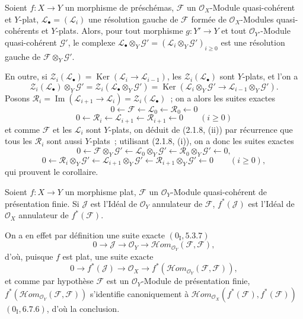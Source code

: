 \begin{corollary}[2.1.10]
\label{IV.2.1.10-fr}
Soient $f:X\to Y$ un morphisme de préschémas, $\mathscr F$ un
$\mathcal O_X$-Module quasi-cohérent et $Y$-plat,
$\mathscr L_\bullet=(\mathscr L_i)$ une résolution gauche de $\mathscr F$
formée de $\mathcal O_X$-Modules quasi-cohérents et $Y$-plats. Alors, pour
tout morphisme $g:Y'\to Y$ et tout $\mathcal O_{Y'}$-Module quasi-cohérent
$\mathscr G'$, le complexe
$\mathscr L_\bullet\otimes_Y\mathscr G'=
(\mathscr L_i\otimes_Y\mathscr G')_{i\geq0}$ est une résolution gauche de
$\mathscr F\otimes_Y\mathscr G'$.

En outre, si
$\mathscr Z_i(\mathscr L_\bullet)=\operatorname{Ker}
(\mathscr L_i\to\mathscr L_{i-1})$, les $\mathscr Z_i(\mathscr L_\bullet)$
sont $Y$-plats, et l'on a
\[
\mathscr Z_i(\mathscr L_\bullet)\otimes_Y\mathscr G'
=\mathscr Z_i(\mathscr L_\bullet\otimes_Y\mathscr G')
=\operatorname{Ker}(\mathscr L_i\otimes_Y\mathscr G'
\to\mathscr L_{i-1}\otimes_Y\mathscr G').
\]
Posons
$\mathscr R_i=\operatorname{Im}(\mathscr L_{i+1}\to\mathscr L_i)
=\mathscr Z_i(\mathscr L_\bullet)$~; on a alors les suites exactes
\[
0\leftarrow\mathscr F\leftarrow\mathscr L_0\leftarrow\mathscr R_0\leftarrow0
\]
\[
0\leftarrow\mathscr R_i\leftarrow\mathscr L_{i+1}
\leftarrow\mathscr R_{i+1}\leftarrow0\qquad(i\geq0)
\]
et comme $\mathscr F$ et les $\mathscr L_i$ sont $Y$-plats, on déduit de
(2.1.8, (ii)) par récurrence que tous les $\mathscr R_i$ sont aussi
$Y$-plats~; utilisant (2.1.8, (i)), on a donc les suites exactes
\[
0\leftarrow\mathscr F\otimes_Y\mathscr G'
\leftarrow\mathscr L_0\otimes_Y\mathscr G'
\leftarrow\mathscr R_0\otimes_Y\mathscr G'\leftarrow0,
\]
\[
0\leftarrow\mathscr R_i\otimes_Y\mathscr G'
\leftarrow\mathscr L_{i+1}\otimes_Y\mathscr G'
\leftarrow\mathscr R_{i+1}\otimes_Y\mathscr G'\leftarrow0
\qquad(i\geq0),
\]
qui prouvent le corollaire.
\end{corollary}

\begin{proposition}[2.1.11]
\label{IV.2.1.11-fr}
Soient $f:X\to Y$ un morphisme plat, $\mathscr F$ un $\mathcal O_Y$-Module
quasi-cohérent de présentation finie. Si $\mathscr J$ est l'Idéal de
$\mathcal O_Y$ annulateur de $\mathscr F$, $f^*(\mathscr J)$ est l'Idéal de
$\mathcal O_X$ annulateur de $f^*(\mathscr F)$.
\end{proposition}

On a en effet par définition une suite exacte $(0_{\mathrm I},5.3.7)$
\[
0\to\mathscr J\to\mathcal O_Y\to
\mathscr H\!om_{\mathcal O_Y}(\mathscr F,\mathscr F),
\]
d'où, puisque $f$ est plat, une suite exacte
\[
0\to f^*(\mathscr J)\to\mathcal O_X\to
f^*(\mathscr H\!om_{\mathcal O_Y}(\mathscr F,\mathscr F)),
\]
et comme par hypothèse $\mathscr F$ est un $\mathcal O_Y$-Module de
présentation finie,
$f^*(\mathscr H\!om_{\mathcal O_Y}(\mathscr F,\mathscr F))$ s'identifie
canoniquement à
$\mathscr H\!om_{\mathcal O_X}(f^*(\mathscr F),f^*(\mathscr F))$
$(0_{\mathrm I},6.7.6)$, d'où la conclusion.

